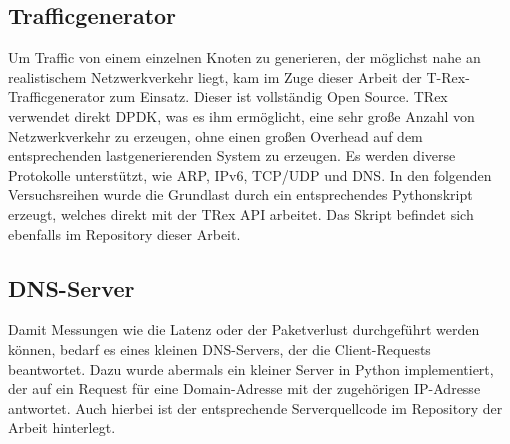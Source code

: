 \subsection{Trafficgenerator}
Um Traffic von einem einzelnen Knoten zu generieren, der möglichst nahe an realistischem Netzwerkverkehr liegt, kam im Zuge dieser Arbeit der T-Rex-Trafficgenerator zum Einsatz. Dieser ist vollständig Open Source. TRex verwendet direkt DPDK, was es ihm ermöglicht, eine sehr große Anzahl von Netzwerkverkehr zu erzeugen, ohne einen großen Overhead auf dem entsprechenden lastgenerierenden System zu erzeugen. Es werden diverse Protokolle unterstützt, wie ARP, IPv6, TCP/UDP und DNS. In den folgenden Versuchsreihen wurde die Grundlast durch ein entsprechendes Pythonskript erzeugt, welches direkt mit der TRex API arbeitet. Das Skript befindet sich ebenfalls im Repository dieser Arbeit.
\subsection{DNS-Server}
Damit Messungen wie die Latenz oder der Paketverlust durchgeführt werden können, bedarf es eines kleinen DNS-Servers, der die Client-Requests beantwortet. Dazu wurde abermals ein kleiner Server in Python implementiert, der auf ein Request für eine Domain-Adresse mit der zugehörigen IP-Adresse antwortet. Auch hierbei ist der entsprechende Serverquellcode im Repository der Arbeit hinterlegt.
